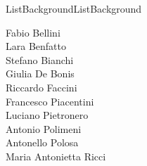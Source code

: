 \begin{fsmbox}{6cm}{ListBackground}{ListBackground}
\begin{minipage}{4.7cm}
Fabio Bellini\\
Lara Benfatto\\
Stefano Bianchi\\
Giulia De Bonis\\
Riccardo Faccini\\
Francesco Piacentini\\
Luciano Pietronero\\
Antonio Polimeni\\
Antonello Polosa\\
Maria Antonietta Ricci
\end{minipage}
\end{fsmbox}
